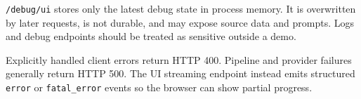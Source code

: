 \documentclass[11pt,a4paper]{article}
\newcommand{\code}[1]{\texttt{#1}}
\begin{document}
\code{/debug/ui} stores only the latest debug state in process memory. It is
overwritten by later requests, is not durable, and may expose source data and
prompts. Logs and debug endpoints should be treated as sensitive outside a demo.

Explicitly handled client errors return HTTP 400. Pipeline and provider failures
generally return HTTP 500. The UI streaming endpoint instead emits structured
\code{error} or \code{fatal\_error} events so the browser can show partial progress.



\end{document}

